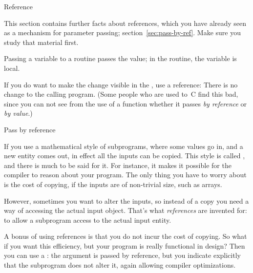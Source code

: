 
 {Reference}
\label{sec:reference}

This section contains further facts about references, which you have
already seen as a mechanism for parameter passing;
section~\ref{sec:pass-by-ref}.
Make sure you study that material first.

Passing a variable to a routine passes the value; in the routine, the
variable is local.


If you do want to make the change visible in the
%
, use a reference:
%
%
There is no change to the calling program. (Some people who are used
to~C find this bad,
since you can not see from the use of a function whether it passes
%
\emph{by reference}
%
or \emph{by value}.)

 {Pass by reference}

If you use a mathematical style of subprograms, where some values go
in, and a new entity comes out, in effect all the inputs can be
copied. This style is called
, and
there is much to be said for it. For instance, it makes it possible
for the compiler to reason about your program.
The only thing you have to worry
about is the cost of copying, if the inputs are of non-trivial size,
such as arrays.

However, sometimes you want to alter the inputs, so instead of a copy
you need a way of accessing the actual input object. That's what
\emph{references} are invented for: to allow a subprogram access to the
actual input entity.

A bonus of using references is that you do not incur the cost of
copying. So what if you want this efficiency, but your program is
really functional in design? Then you can use a
: the argument is passed by reference,
but you indicate explicitly that the subprogram does not alter it,
again allowing compiler optimizations.

